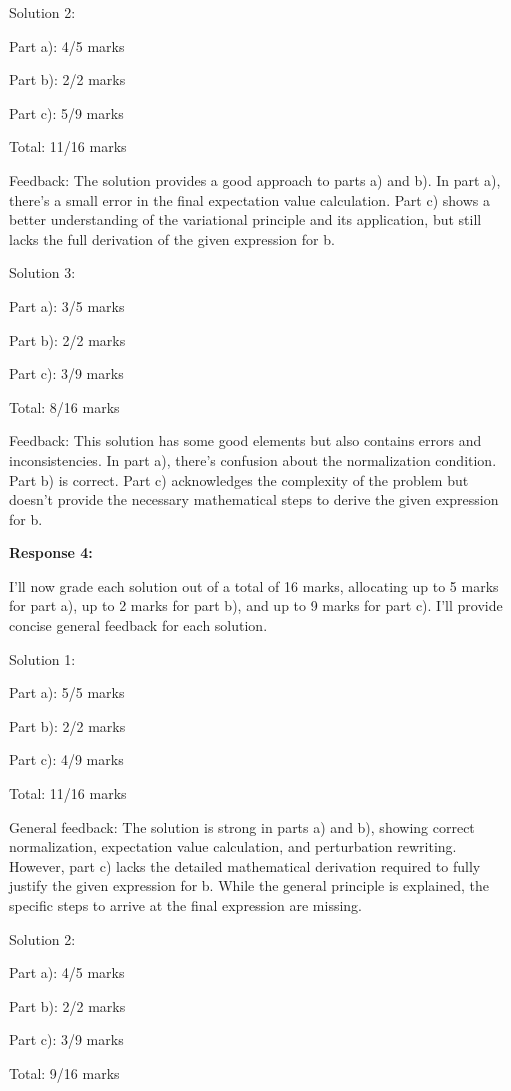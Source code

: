 \documentclass[a4paper,11pt]{article}
\begin{document}
Solution 2:

Part a): 4/5 marks

Part b): 2/2 marks

Part c): 5/9 marks

Total: 11/16 marks

Feedback: The solution provides a good approach to parts a) and b). In part a), there's a small error in the final expectation value calculation. Part c) shows a better understanding of the variational principle and its application, but still lacks the full derivation of the given expression for b.

Solution 3:

Part a): 3/5 marks

Part b): 2/2 marks

Part c): 3/9 marks

Total: 8/16 marks

Feedback: This solution has some good elements but also contains errors and inconsistencies. In part a), there's confusion about the normalization condition. Part b) is correct. Part c) acknowledges the complexity of the problem but doesn't provide the necessary mathematical steps to derive the given expression for b.

\bigskip
\textbf{Response 4:}

I'll now grade each solution out of a total of 16 marks, allocating up to 5 marks for part a), up to 2 marks for part b), and up to 9 marks for part c). I'll provide concise general feedback for each solution.

Solution 1:

Part a): 5/5 marks

Part b): 2/2 marks

Part c): 4/9 marks

Total: 11/16 marks

General feedback: The solution is strong in parts a) and b), showing correct normalization, expectation value calculation, and perturbation rewriting. However, part c) lacks the detailed mathematical derivation required to fully justify the given expression for b. While the general principle is explained, the specific steps to arrive at the final expression are missing.

Solution 2:

Part a): 4/5 marks

Part b): 2/2 marks

Part c): 3/9 marks

Total: 9/16 marks
\end{document}
